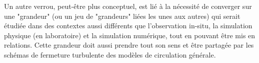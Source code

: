 Un autre verrou, peut-être plus conceptuel, est lié à la nécessité de converger sur une "grandeur" (ou un jeu de "grandeurs" liées les unes aux autres) qui serait étudiée dans des contextes aussi différents que l'observation in-situ, la simulation physique (en laboratoire) et la simulation numérique, tout en pouvant être mis en relations. Cette grandeur doit aussi prendre tout son sens et être partagée par les schémas de fermeture turbulente des modèles de circulation générale.







